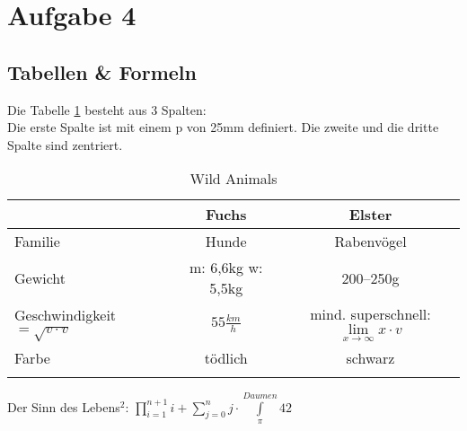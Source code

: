 \section{Aufgabe 4}
\subsection{Tabellen \& Formeln}
Die Tabelle \ref{tab:ani} besteht aus 3 Spalten:\\
Die erste Spalte ist mit einem p von 25mm definiert. Die zweite und die dritte Spalte sind zentriert.

\begin{longtable}{p{25mm}|c|c}
& Fuchs & Elster\\
\hline
\hline
Familie & Hunde & Rabenvögel\\
\hline
Gewicht & m: 6,6kg w: 5,5kg & 200--250g\\
\hline
Geschwindigkeit $ = \sqrt{v\cdot v}$ & $55\frac{km}{h}$ & mind. superschnell: $\lim\limits_{x \rightarrow \infty} x \cdot v$ \\
\hline
Farbe & tödlich & schwarz\\
\hline
\caption{Wild Animals}
\label{tab:ani}
\end{longtable}

Der Sinn des Lebens$^2$: $\prod\limits_{i=1}^{n+1} i + \sum_{j=0}^{n} j \cdot \int\limits_{\pi}^{Daumen} 42$

